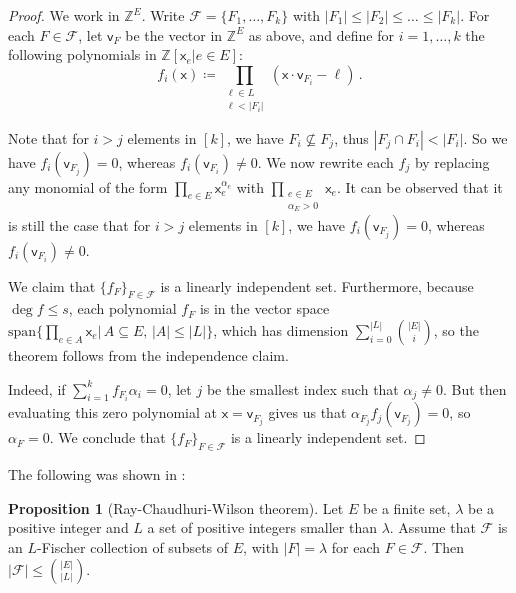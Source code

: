 \documentclass[12pt]{amsart}
\theoremstyle{definition}
\newtheorem{prop}[thm]{Proposition}
\newcommand{\Z}{\mathbb{Z}}
\newcommand{\FF}{\mathcal F}
\newcommand{\vv}{\mathsf{v}}
\newcommand{\vx}{\mathsf{x}}
\newcommand{\spn}{\mathrm{span}}
\begin{document}
\begin{proof}
We work in $\Z^E$.
Write $\FF = \{F_1, \ldots , F_k\}$ with $|F_1| \leq |F_2| \leq \ldots \leq |F_k|$.
For each $F \in \FF$, let $\vv_F$ be the vector in $\Z^E$ as above, and define for $i= 1, \ldots , k$ the following polynomials in $\Z[\vx_e | e \in E]$:
$$f_i(\vx) \coloneqq \prod_{ \substack{\ell \in L \\ \ell < |F_i|}} (\vx \cdot \vv_{F_i} - \ell) \, .$$

Note that for $i > j $ elements in $[k]$, we have $F_i \not\subseteq F_j$, thus $|F_j \cap F_i| <  |F_i|$.
So we have $f_i(\vv_{F_j}) = 0$, whereas $f_i(\vv_{F_i}) \neq 0$.
We now rewrite each $f_j$ by replacing any monomial of the form $\prod_{e\in E}\vx_e^{\alpha_e}$ with $\prod_{\substack{e\in E\\ \alpha_E > 0}}\vx_e$.
It can be observed that it is still the case that for $i > j $ elements in $[k]$, we have $f_i(\vv_{F_j}) = 0$, whereas $f_i(\vv_{F_i}) \neq 0$.

We claim that $\{ f_F \}_{F \in \FF}$ is a linearly independent set.
Furthermore, because $\deg f \leq s$, each polynomial $f_F$ is in the vector space  $\spn\{\prod_{e \in A} \vx_e | \, A \subseteq E, \, |A| \leq |L| \}$, which has dimension $\sum_{i=0}^{|L|} \binom{|E|}{i}$, so the theorem follows from the independence claim.

Indeed, if $\sum_{i = 1}^k f_{F_i} \alpha_i =0$, let $j$ be the smallest index such that $\alpha_j \neq 0$.
But then evaluating this zero polynomial at $\vx = \vv_{F_j} $ gives us that $\alpha_{F_j} f_j(\vv_{F_j}) = 0$, so $\alpha_F = 0$. 
We conclude that $\{ f_F \}_{F \in \FF}$ is a linearly independent set.
\end{proof}

The following was shown in \cite{ray1975t}:

\begin{prop}[Ray-Chaudhuri-Wilson theorem]
Let $E$ be a finite set, $\lambda $ be a positive integer and $L$ a set of positive integers smaller than $\lambda$.
Assume that $\FF $ is an $L$-Fischer collection of subsets of $E$, with $|F| = \lambda $ for each $F \in \FF$.
Then $|\FF| \leq \binom{|E|}{|L|}$.
\end{prop}
\end{document}
